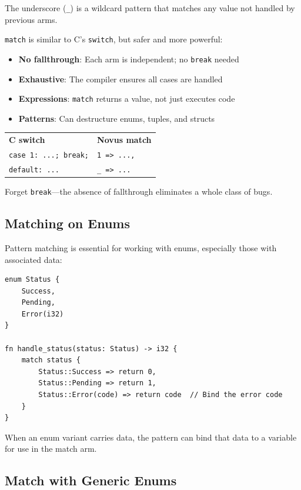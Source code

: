 The underscore (\texttt{\_}) is a wildcard pattern that matches any value not handled by previous arms.

\begin{comingfromc}
\texttt{match} is similar to C's \texttt{switch}, but safer and more powerful:

\begin{itemize}
\item \textbf{No fallthrough}: Each arm is independent; no \texttt{break} needed
\item \textbf{Exhaustive}: The compiler ensures all cases are handled
\item \textbf{Expressions}: \texttt{match} returns a value, not just executes code
\item \textbf{Patterns}: Can destructure enums, tuples, and structs
\end{itemize}

\begin{tabular}{ll}
\textbf{C switch} & \textbf{Novus match} \\
\texttt{case 1: ...; break;} & \texttt{1 => ...,} \\
\texttt{default: ...} & \texttt{\_ => ...} \\
\end{tabular}

Forget \texttt{break}---the absence of fallthrough eliminates a whole class of bugs.
\end{comingfromc}

\subsection{Matching on Enums}
\label{subsec:match-enums}

Pattern matching is essential for working with enums, especially those with associated data:

\begin{lstlisting}
enum Status {
    Success,
    Pending,
    Error(i32)
}

fn handle_status(status: Status) -> i32 {
    match status {
        Status::Success => return 0,
        Status::Pending => return 1,
        Status::Error(code) => return code  // Bind the error code
    }
}
\end{lstlisting}

When an enum variant carries data, the pattern can bind that data to a variable for use in the match arm.

\subsection{Match with Generic Enums}
\label{subsec:match-generic}

